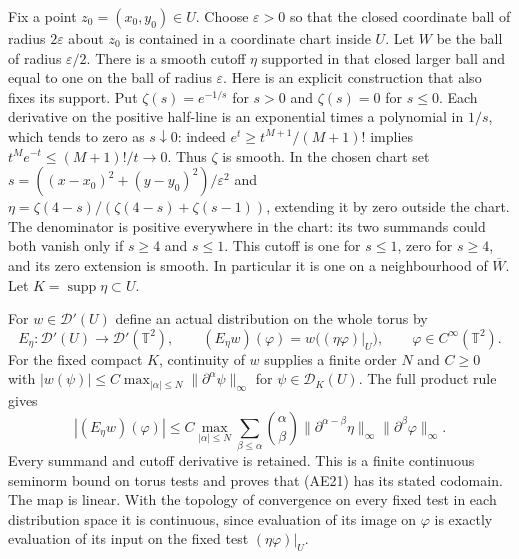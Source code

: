 \documentclass[
  11pt,
]{article}
\begin{document}
Fix a point \(z_0=(x_0,y_0)\in U\). Choose \(\varepsilon>0\) so that the
closed coordinate ball of radius \(2\varepsilon\) about \(z_0\) is
contained in a coordinate chart inside \(U\). Let \(W\) be the ball of
radius \(\varepsilon/2\). There is a smooth cutoff \(\eta\) supported in
that closed larger ball and equal to one on the ball of radius
\(\varepsilon\). Here is an explicit construction that also fixes its
support. Put \(\zeta(s)=e^{-1/s}\) for \(s>0\) and \(\zeta(s)=0\) for
\(s\leq0\). Each derivative on the positive half-line is an exponential
times a polynomial in \(1/s\), which tends to zero as \(s\downarrow0\):
indeed \(e^t\geq t^{M+1}/(M+1)!\) implies \(t^Me^{-t}\leq(M+1)!/t\to0\).
Thus \(\zeta\) is smooth. In the chosen chart set
\(s=((x-x_0)^2+(y-y_0)^2)/\varepsilon^2\) and
\(\eta=\zeta(4-s)/(\zeta(4-s)+\zeta(s-1))\), extending it by zero
outside the chart. The denominator is positive everywhere in the chart:
its two summands could both vanish only if \(s\geq4\) and \(s\leq1\).
This cutoff is one for \(s\leq1\), zero for \(s\geq4\), and its zero
extension is smooth. In particular it is one on a neighbourhood of
\(\overline W\). Let \(K=\operatorname{supp}\eta\subset U\).

For \(w\in\mathcal D'(U)\) define an actual distribution on the whole
torus by \[
 E_\eta:\mathcal D'(U)\longrightarrow\mathcal D'(\mathbb T^2),
 \qquad (E_\eta w)(\varphi)=w\bigl((\eta\varphi)|_U\bigr),
 \qquad \varphi\in C^\infty(\mathbb T^2).
 \tag{AE21}
\] For the fixed compact \(K\), continuity of \(w\) supplies a finite
order \(N\) and \(C\geq0\) with \(|w(\psi)|\leq C\max_{|\alpha|\leq N}
\|\partial^\alpha\psi\|_\infty\) for \(\psi\in\mathcal D_K(U)\). The
full product rule gives \[
 |(E_\eta w)(\varphi)|
 \leq C\max_{|\alpha|\leq N}
 \sum_{\beta\leq\alpha}\binom{\alpha}{\beta}
 \|\partial^{\alpha-\beta}\eta\|_\infty
 \|\partial^\beta\varphi\|_\infty.
 \tag{AE22}
\] Every summand and cutoff derivative is retained. This is a finite
continuous seminorm bound on torus tests and proves that (AE21) has its
stated codomain. The map is linear. With the topology of convergence on
every fixed test in each distribution space it is continuous, since
evaluation of its image on \(\varphi\) is exactly evaluation of its
input on the fixed test \((\eta\varphi)|_U\).
\end{document}
